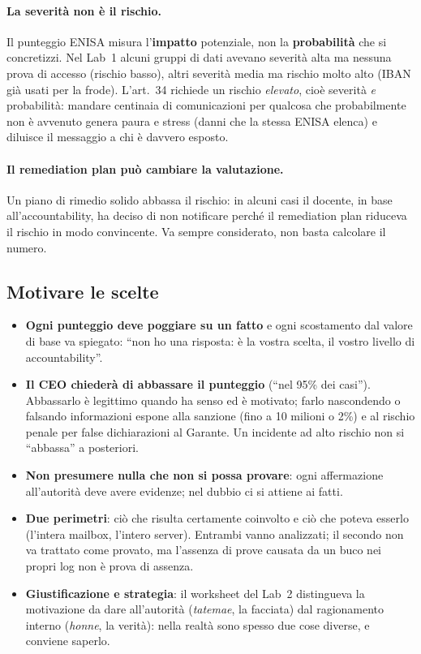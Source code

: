 \paragraph{La severità non è il rischio.} Il punteggio ENISA misura l'\textbf{impatto} potenziale, non la
\textbf{probabilità} che si concretizzi. Nel Lab~1 alcuni gruppi di dati avevano severità alta ma nessuna
prova di accesso (rischio basso), altri severità media ma rischio molto alto (IBAN già usati per la
frode). L'art.~34 richiede un rischio \emph{elevato}, cioè severità \emph{e} probabilità: mandare centinaia
di comunicazioni per qualcosa che probabilmente non è avvenuto genera paura e stress (danni che la stessa
ENISA elenca) e diluisce il messaggio a chi è davvero esposto.

\paragraph{Il remediation plan può cambiare la valutazione.} Un piano di rimedio solido abbassa il
rischio: in alcuni casi il docente, in base all'accountability, ha deciso di non notificare perché il
remediation plan riduceva il rischio in modo convincente. Va sempre considerato, non basta calcolare il
numero.

\subsection{Motivare le scelte}
\label{sec:breach-motivare}
\begin{itemize}
  \item \textbf{Ogni punteggio deve poggiare su un fatto} e ogni scostamento dal valore di base va
    spiegato: ``non ho una risposta: è la vostra scelta, il vostro livello di accountability''.
  \item \textbf{Il CEO chiederà di abbassare il punteggio} (``nel 95\% dei casi''). Abbassarlo è
    legittimo quando ha senso ed è motivato; farlo nascondendo o falsando informazioni espone alla
    sanzione (fino a 10 milioni o 2\%) e al rischio penale per false dichiarazioni al Garante. Un
    incidente ad alto rischio non si ``abbassa'' a posteriori.
  \item \textbf{Non presumere nulla che non si possa provare}: ogni affermazione all'autorità deve avere
    evidenze; nel dubbio ci si attiene ai fatti.
  \item \textbf{Due perimetri}: ciò che risulta certamente coinvolto e ciò che poteva esserlo (l'intera
    mailbox, l'intero server). Entrambi vanno analizzati; il secondo non va trattato come provato, ma
    l'assenza di prove causata da un buco nei propri log non è prova di assenza.
  \item \textbf{Giustificazione e strategia}: il worksheet del Lab~2 distingueva la motivazione da dare
    all'autorità (\emph{tatemae}, la facciata) dal ragionamento interno (\emph{honne}, la verità): nella
    realtà sono spesso due cose diverse, e conviene saperlo.
\end{itemize}

